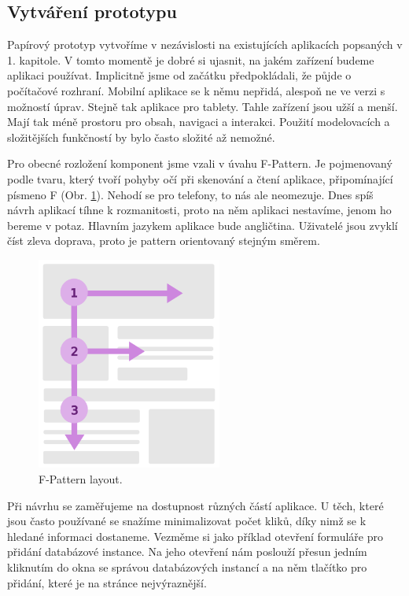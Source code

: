 \subsection{Vytváření prototypu}

Papírový prototyp vytvoříme v nezávislosti na existujících aplikacích popsaných v 1. kapitole. V tomto momentě je dobré si ujasnit, na jakém zařízení budeme aplikaci používat. Implicitně jsme od začátku předpokládali, že půjde o počítačové rozhraní. Mobilní aplikace se k němu nepřidá, alespoň ne ve verzi s možností úprav. Stejně tak aplikace pro tablety. Tahle zařízení jsou užší a menší. Mají tak méně prostoru pro obsah, navigaci a interakci. Použití modelovacích a složitějších funkčností by bylo často složité až nemožné.

Pro obecné rozložení komponent jsme vzali v úvahu F-Pattern. Je pojmenovaný podle tvaru, který tvoří pohyby očí při skenování a čtení aplikace, připomínající písmeno F (Obr. \ref{obr05:fpattern}). Nehodí se pro telefony, to nás ale neomezuje. Dnes spíš návrh aplikací tíhne k rozmanitosti, proto na něm aplikaci nestavíme, jenom ho bereme v potaz. Hlavním jazykem aplikace bude angličtina. Uživatelé jsou zvyklí číst zleva doprava, proto je pattern orientovaný stejným směrem.

\begin{figure}[htb]
    \centering
    \includegraphics[height=70mm]{../img/F-Pattern}
    \caption{F-Pattern layout.}
    \label{obr05:fpattern}
  \end{figure}

Při návrhu se zaměřujeme na dostupnost různých částí aplikace. U těch, které jsou často používané se snažíme minimalizovat počet kliků, díky nimž se k hledané informaci dostaneme. Vezměme si jako příklad otevření formuláře pro přidání databázové instance. Na jeho otevření nám poslouží přesun jedním kliknutím do okna se správou databázových instancí a na něm tlačítko pro přidání, které je na stránce nejvýraznější.

